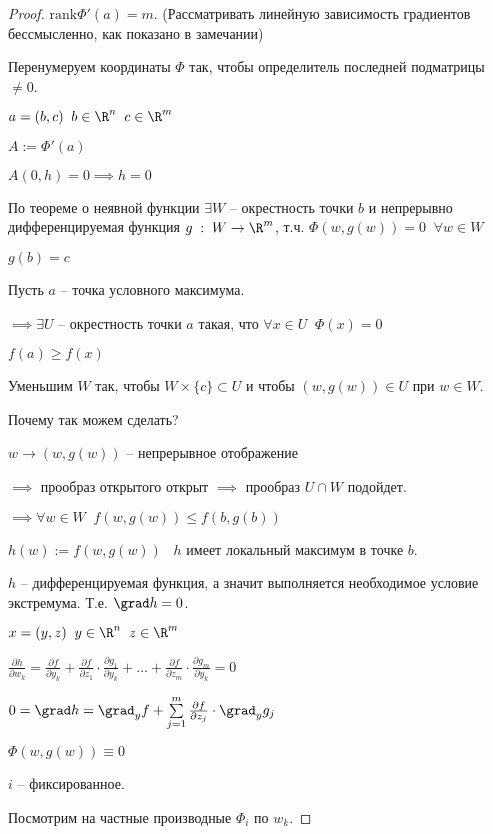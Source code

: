 \begin{proof}\thmslashn
	
	$\text{rank} \Phi'(a) = m$. (Рассматривать линейную зависимость градиентов бессмысленно, как показано в замечании) 
	
	Перенумеруем координаты $\Phi$ так, чтобы определитель последней подматрицы $\ne 0$.
	
	$a = (b,c) \;\; b \in \R^n \;\; c \in \R^m$
	
	$A := \Phi'(a)$
	
	$A(0, h) = 0 \implies h = 0$
	
	По теореме о неявной функции $\exists W$ -- окрестность точки $b$ и непрерывно дифференцируемая функция $g \; : \; W \to \R^m$, т.ч. $\Phi(w, g(w)) = 0\;\; \forall w \in W$
	
	$g(b) = c$
	
	Пусть $a$ -- точка условного максимума. 
	
	$\implies \exists U$ -- окрестность точки $a$ такая, что $\forall x \in U \;\; \Phi(x) = 0$
	
	$f(a) \ge f(x)$
	
	Уменьшим $W$ так, чтобы $W \times \{c\} \subset U$ и чтобы $(w, g(w)) \in U$ при $w \in W$.
	
	Почему так можем сделать?
	
	$w \to (w, g(w))$ -- непрерывное отображение
	
	$\implies$ прообраз открытого открыт $\implies $ прообраз $U \cap W$ подойдет.
	
	$\implies \forall w \in W \;\; f(w, g(w)) \le f(b, g(b))$
	
	$h(w) := f(w, g(w))\;\;\; h$ имеет локальный максимум в точке $b$.
	
	$h$ -- дифференцируемая функция, а значит выполняется необходимое условие экстремума. Т.е. $\grad h = 0$.
	
	$x = (y, z) \;\; y \in \R^n \;\; z\in \R^m$
	
	$\frac{\partial h}{\partial w_k} = \frac{\partial f}{\partial y_k} + \frac{\partial f}{\partial z_1} \cdot \frac{\partial g_1}{\partial y_k} +\ldots+ \frac{\partial f}{\partial z_m} \cdot \frac{\partial g_m}{\partial y_k} = 0$
	
	$0 = \grad h = \grad_y f+ \sum\limits_{j = 1}^{m} \frac{\partial f}{\partial z_j} \cdot \grad_y g_j$
	
	$\Phi(w, g(w)) \equiv 0$
	
	$i$ -- фиксированное.
	
	Посмотрим на частные производные $\Phi_i$ по $w_k$. 
	

\end{proof}
